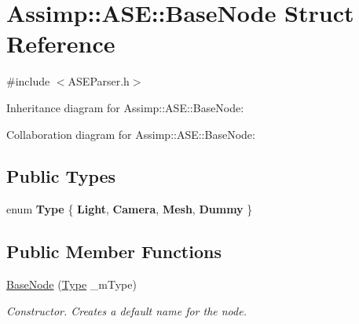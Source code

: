 \hypertarget{struct_assimp_1_1_a_s_e_1_1_base_node}{\section{Assimp\+:\+:A\+S\+E\+:\+:Base\+Node Struct Reference}
\label{struct_assimp_1_1_a_s_e_1_1_base_node}
}


{\ttfamily \#include $<$A\+S\+E\+Parser.\+h$>$}



Inheritance diagram for Assimp\+:\+:A\+S\+E\+:\+:Base\+Node\+:


Collaboration diagram for Assimp\+:\+:A\+S\+E\+:\+:Base\+Node\+:
\subsection*{Public Types}
\begin{DoxyCompactItemize}
\item 
\hypertarget{struct_assimp_1_1_a_s_e_1_1_base_node_a23f5e4fe52cccc599c42823b766e7bb0}{enum {\bfseries Type} \{ {\bfseries Light}, 
{\bfseries Camera}, 
{\bfseries Mesh}, 
{\bfseries Dummy}
 \}}\label{struct_assimp_1_1_a_s_e_1_1_base_node_a23f5e4fe52cccc599c42823b766e7bb0}

\end{DoxyCompactItemize}
\subsection*{Public Member Functions}
\begin{DoxyCompactItemize}
\item 
\hypertarget{struct_assimp_1_1_a_s_e_1_1_base_node_a36f0c4b1795d9066a097cf229f09e66a}{\hyperlink{struct_assimp_1_1_a_s_e_1_1_base_node_a36f0c4b1795d9066a097cf229f09e66a}{Base\+Node} (\hyperlink{struct_type}{Type} \+\_\+m\+Type)}\label{struct_assimp_1_1_a_s_e_1_1_base_node_a36f0c4b1795d9066a097cf229f09e66a}

\begin{DoxyCompactList}\small\item\em Constructor. Creates a default name for the node. \end{DoxyCompactList}\end{DoxyCompactItemize}
